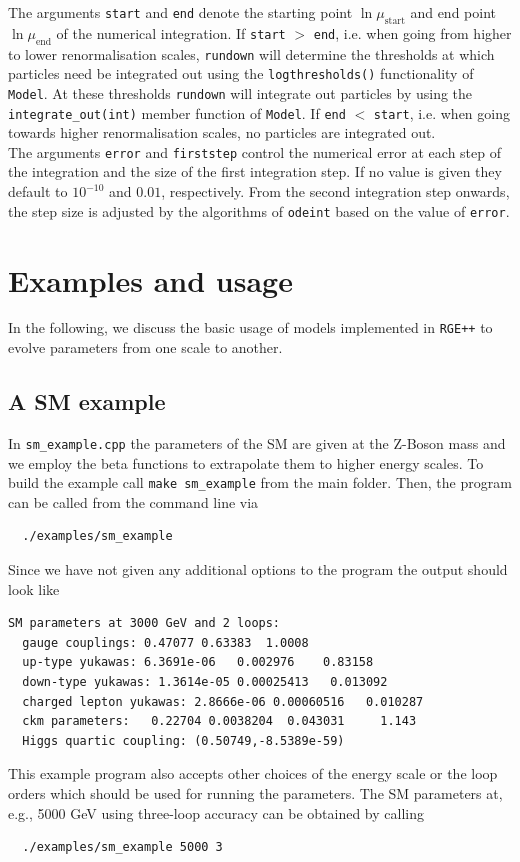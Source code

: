 \documentclass[preprint,12pt]{elsarticle}
\begin{document}
The arguments \texttt{start} and \texttt{end} denote the starting point $\ln\mu_{\mathrm{start}}$ and end point $\ln\mu_{\mathrm{end}}$ of the numerical integration. If \texttt{start} $>$ \texttt{end}, i.e. when going from higher to lower renormalisation scales, \texttt{rundown} will determine the thresholds at which particles need be integrated out using the \texttt{logthresholds()} functionality of \texttt{Model}. At these thresholds \texttt{rundown} will integrate out particles by using the \texttt{integrate\_out(int)} member function of \texttt{Model}. If \texttt{end} $<$ \texttt{start}, i.e. when going towards higher renormalisation scales, no particles are integrated out.\\
The arguments \texttt{error} and \texttt{firststep} control the numerical error at each step of the integration and the size of the first integration step. If no value is given they default to $10^{-10}$ and $0.01$, respectively. From the second integration step onwards, the step size is adjusted by the algorithms of \texttt{odeint} based on the value of \texttt{error}.

\section{\label{sec::examples}Examples and usage}
In the following, we discuss the basic usage of models implemented in \texttt{RGE++} to evolve parameters from one scale to another.


\subsection{\label{sec::sm_example} A SM example}
In \texttt{sm\_example.cpp} the parameters of the SM are given at the Z-Boson mass and we employ the beta functions to extrapolate them to higher energy scales. 
To build the example call \texttt{make sm\_example} from the main folder. Then, the program can be called from the command line via
\begin{lstlisting}
  ./examples/sm_example
\end{lstlisting}
Since we have not given any additional options to the program the output should look like
\begin{lstlisting}[keywordstyle=\color{blue}]
  SM parameters at 3000 GeV and 2 loops:
  gauge couplings: 0.47077 0.63383  1.0008
  up-type yukawas: 6.3691e-06   0.002976    0.83158
  down-type yukawas: 1.3614e-05 0.00025413   0.013092
  charged lepton yukawas: 2.8666e-06 0.00060516   0.010287
  ckm parameters:   0.22704 0.0038204  0.043031     1.143
  Higgs quartic coupling: (0.50749,-8.5389e-59)
\end{lstlisting}
This example program also accepts other choices of the energy scale or the loop orders which should be used for running the parameters.
The SM parameters at, e.g., 5000 GeV using three-loop accuracy can be obtained by calling
\begin{lstlisting}
  ./examples/sm_example 5000 3
\end{lstlisting}
\end{document}
